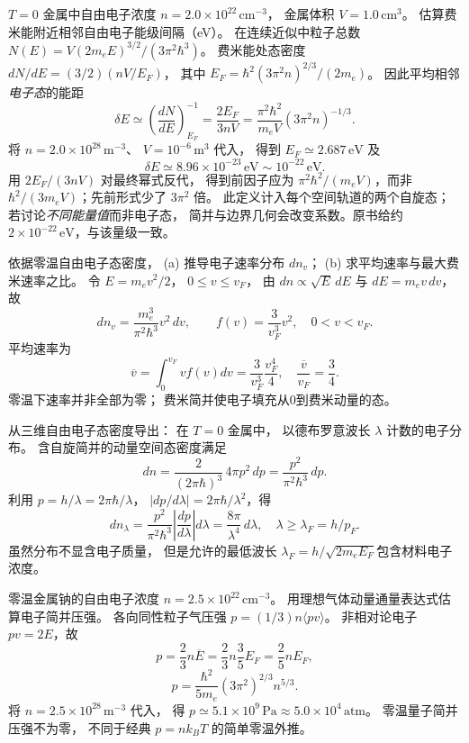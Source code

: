 $T=0$ 金属中自由电子浓度
$n=2.0\times10^{22}\,\mathrm{cm^{-3}}$，
金属体积 $V=1.0\,\mathrm{cm^3}$。
估算费米能附近相邻自由电子能级间隔（eV）。
\exsolution
在连续近似中粒子总数
$N(E)=V(2m_eE)^{3/2}/(3\pi^2\hbar^3)$。
费米能处态密度
$dN/dE=(3/2)(nV/E_F)$，
其中
$E_F=\hbar^2(3\pi^2n)^{2/3}/(2m_e)$。
因此平均相邻\emph{电子态}的能距
\[
 \boxed{\delta E\simeq
 \left(\frac{dN}{dE}\right)^{-1}_{E_F}
 =\frac{2E_F}{3nV}
 =\frac{\pi^2\hbar^2}{m_eV}(3\pi^2n)^{-1/3}}.
\]
将 $n=2.0\times10^{28}\,\mathrm{m^{-3}}$、
$V=10^{-6}\,\mathrm{m^3}$ 代入，
得到 $E_F\simeq2.687\,\mathrm{eV}$ 及
\[
\boxed{\delta E\simeq8.96\times10^{-23}\,\mathrm{eV}
\sim10^{-22}\,\mathrm{eV}}.
\]
\excheck 用 $2E_F/(3nV)$ 对最终幂式反代，
得到前因子应为 $\pi^2\hbar^2/(m_eV)$，而非
$\hbar^2/(3m_eV)$；先前形式少了 $3\pi^2$ 倍。
此定义计入每个空间轨道的两个自旋态；
若讨论\emph{不同能量值}而非电子态，
简并与边界几何会改变系数。原书给约
$2\times10^{-22}\,\mathrm{eV}$，与该量级一致。

依据零温自由电子态密度，
(a) 推导电子速率分布 $dn_v$；
(b) 求平均速率与最大费米速率之比。
\exsolution
令 $E=m_ev^2/2$，
$0\le v\le v_F$，
由 $dn\propto\sqrt E\,dE$ 与
$dE=m_ev\,dv$，故
\[
 \boxed{dn_v=\frac{m_e^3}{\pi^2\hbar^3}v^2\,dv},
 \qquad
 \boxed{f(v)=\frac3{v_F^3}v^2},
 \quad 0<v<v_F.
\]
平均速率为
\[
 \overline v=\int_0^{v_F}vf(v)dv
 =\frac{3}{v_F^3}\frac{v_F^4}{4},
 \quad \boxed{\frac{\overline v}{v_F}=\frac34}.
\]
\excheck 零温下速率并非全部为零；
费米简并使电子填充从0到费米动量的态。

从三维自由电子态密度导出：
在 $T=0$ 金属中，
以德布罗意波长 $\lambda$ 计数的电子分布。
\exsolution
含自旋简并的动量空间态密度满足
\[
 dn=\frac{2}{(2\pi\hbar)^3}\,4\pi p^2\,dp
 =\frac{p^2}{\pi^2\hbar^3}\,dp.
\]
利用 $p=h/\lambda=2\pi\hbar/\lambda$，
$|dp/d\lambda|=2\pi\hbar/\lambda^2$，得
\[
 \boxed{dn_\lambda=
 \frac{p^2}{\pi^2\hbar^3}
 \left|\frac{dp}{d\lambda}\right|d\lambda
 =\frac{8\pi}{\lambda^4}\,d\lambda},
 \quad \lambda\ge\lambda_F=h/p_F.
\]
\excheck 虽然分布不显含电子质量，
但是允许的最低波长
$\lambda_F=h/\sqrt{2m_eE_F}$包含材料电子浓度。

零温金属钠的自由电子浓度
$n=2.5\times10^{22}\,\mathrm{cm^{-3}}$。
用理想气体动量通量表达式估算电子简并压强。
\exsolution
各向同性粒子气压强
$p=(1/3)n\langle pv\rangle$。
非相对论电子 $pv=2E$，故
\[
 p=\frac23n\overline E
 =\frac23n\frac35E_F=\frac25nE_F,
\]
\[
 \boxed{p=\frac{\hbar^2}{5m_e}(3\pi^2)^{2/3}n^{5/3}}.
\]
将 $n=2.5\times10^{28}\,\mathrm{m^{-3}}$ 代入，
得
$\boxed{p\simeq5.1\times10^9\,\mathrm{Pa}
 \approx5.0\times10^4\,\mathrm{atm}}$。
\excheck 零温量子简并压强不为零，
不同于经典 $p=nk_BT$ 的简单零温外推。

